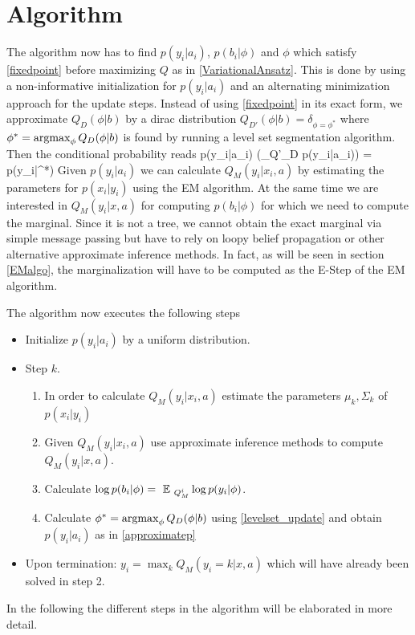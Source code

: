 \documentclass{article} %
\begin{document}
\section{Algorithm}
The algorithm now has to find $p(y_i|a_i)$, $p(b_i|\phi)$ and $\phi$ which satisfy \eqref{fixedpoint} before maximizing $Q$ as in \eqref{VariationalAnsatz}. This is done by using a non-informative initialization for $p(y_i|a_i)$ and an alternating minimization approach for the update steps. Instead of using \eqref{fixedpoint} in its exact form, we approximate $Q_D(\phi|b)$ by a dirac distribution $Q_{D'}(\phi|b) = \delta_{\phi = \phi^*}$ where $\phi^* = \operatorname*{argmax}_{\phi} Q_D(\phi|b)$ is found by running a level set segmentation algorithm. Then the conditional probability reads
\beq
\label{approximatep}
p(y_i|a_i) \approx \exp(\EE_{Q'_D} \log p(y_i|a_i)) =  p(y_i|\phi^*)
\eeq
Given $p(y_i|a_i)$ we can calculate $Q_M(y_i|x_i,a)$ by estimating the parameters for $p(x_i|y_i)$ using the EM algorithm. At the same time we are interested in $Q_M(y_i|x,a)$ for computing $p(b_i|\phi)$ for which we need to compute the marginal. Since it is not a tree, we cannot obtain the exact marginal via simple message passing but have to rely on loopy belief propagation or other alternative approximate inference methods. In fact, as will be seen in section \ref{EMalgo}, the marginalization will have to be computed as the E-Step of the EM algorithm. 

The algorithm now executes the following steps
\begin{itemize}
\item Initialize $p(y_i|a_i)$ by a uniform distribution.
\item Step $k$.
\begin{enumerate}
\item In order to calculate $Q_M(y_i|x_i,a)$ estimate the parameters $\mu_k,\Sigma_k$ of $p(x_i|y_i)$ %
\item Given $Q_M(y_i|x_i,a)$ use approximate inference methods to compute $Q_M(y_i|x,a)$.
\item Calculate $\log p(b_i|\phi) = \mbox{ }\mathbb{E}\mbox{ }_{Q_M^i} \log p(y_i|\phi)$.
\item Calculate $\phi^* = \operatorname*{argmax}_{\phi} Q_D(\phi|b)$ using \eqref{levelset_update} and obtain $p(y_i|a_i)$ as in \eqref{approximatep}
\end{enumerate} 
\item Upon termination: $y_i = \max_k Q_M(y_i = k|x,a)$ which will have already been solved in step 2.
\end{itemize}
In the following the different steps in the algorithm will be elaborated in more detail.
\end{document}
